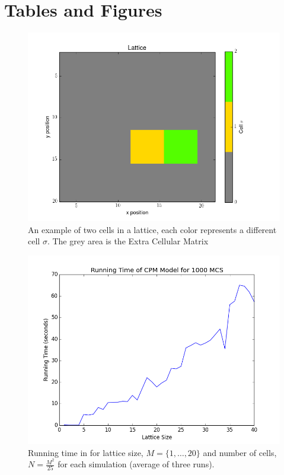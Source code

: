 \documentclass[12pt]{article}
\begin{document}
\pagebreak
\section{Tables and Figures}

\begin{figure}[h]
	\centering
	\includegraphics[scale=0.5]{img/basic}
	\caption{An example of two cells in a lattice, each color represents a different cell $\sigma$. The grey area is the Extra Cellular Matrix}
	\label{basic}
\end{figure}

\begin{figure}[h]
	\centering
	\includegraphics[scale=0.5]{img/runningtime}
	\caption{Running time in  for lattice size, $M =\{1,\ldots, 20\}$ and number of cells, $N=\frac{M^2}{25}$ for each simulation (average of three runs).}
	\label{runningtime}
\end{figure}
\end{document}
